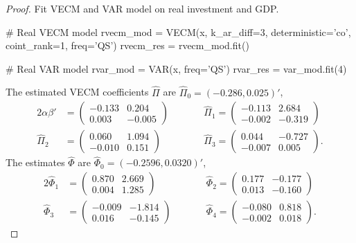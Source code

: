 \documentclass[oneside,reqno]{amsart}
\theoremstyle{definition}
\begin{document}
\begin{enumerate}[label=(\roman*)]
\begin{proof}
Fit VECM and VAR model on real investment and GDP.
\begin{python3code}
# Real VECM model
rvecm_mod = VECM(x, k_ar_diff=3, deterministic='co',
                coint_rank=1, freq='QS')
rvecm_res = rvecm_mod.fit()

# Real VAR model
rvar_mod = VAR(x, freq='QS')
rvar_res = var_mod.fit(4)
\end{python3code}

The estimated VECM coefficients $\widehat \Pi$ are $\widehat\Pi_0 = (-0.286, 0.025)'$,
\begin{alignat*}{2}
	\alpha\beta' &= \begin{pmatrix}
		  -0.133 & 0.204  \\
		  0.003 & -0.005
	\end{pmatrix}  \qquad &&
	\widehat\Pi_1 = \begin{pmatrix}
		-0.113 & 2.684 \\
		 -0.002 & -0.319
	\end{pmatrix} \\
	\widehat\Pi_2 &=\begin{pmatrix}
		0.060 &  1.094 \\
		 -0.010 & 0.151
	\end{pmatrix} \qquad &&
	\widehat\Pi_3 = \begin{pmatrix}
		0.044 &  -0.727 \\
		 -0.007 & 0.005
	\end{pmatrix}.
\end{alignat*}
The estimates $\widehat \Phi$ are $\widehat \Phi_0 = (-0.2596,0.0320)'$,
\begin{alignat*}{2}
	\widehat \Phi_1 &= \begin{pmatrix}
		 0.870 &  2.669 \\
		 0.004 & 1.285
	\end{pmatrix} \qquad &&
	\widehat \Phi_2= \begin{pmatrix}
		0.177 & -0.177 \\
		 0.013 & -0.160
		\end{pmatrix} \\
	\widehat \Phi_3 &= \begin{pmatrix}
		 -0.009 & -1.814 \\
		 0.016 & -0.145 
	\end{pmatrix} \qquad&&
	\widehat \Phi_4  = \begin{pmatrix}
		-0.080 &  0.818 \\
		 -0.002 & 0.018
	\end{pmatrix}.
\end{alignat*}


\end{proof}
\end{enumerate}
\end{document}
